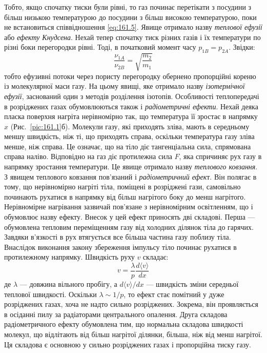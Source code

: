 Тобто, якщо спочатку тиски були рівні, то газ починає перетікати з посудини з більш низькою температурою до посудини з більш високою температурою, поки не встановиться співвідношення \eqref{eq:161.5}.
Явище отримало назву \emph{теплової ефузії} або \emph{ефекту Кнудсена}.
Нехай тепер спочатку тиск різних газів і їх температури по різні боки перегородки рівні.
Тоді, в початковий момент часу $p_{1B} = p_{2A}$.
Звідки:
\begin{equation}
	\frac{\nu_{1A}}{\nu_{2B}} = \sqrt{\frac{m_2}{m_1}}
	\label{eq:161.6}
\end{equation}
%
тобто ефузивні потоки через пористу перегородку обернено пропорційні кореню із молекулярної маси газу.
На цьому явищі, яке отримало назву \emph{ізотермічної ефузії}, заснований один з методів розділення ізотопів.
Особливості теплопередачі в розріджених газах обумовлюються також і \emph{радіометричні ефекти}.
Нехай деяка пласка поверхня нагріта нерівномірно так, що температура її зростає в напрямку $x$ (Рис.~\ref{pic:161.1}б).
Молекули газу, які приходять зліва, мають в середньому меншу швидкість, ніж ті, що приходять справа, оскільки температура газу зліва менше, ніж справа.
Це означає, що на тіло діє тангенціальна сила, спрямована справа наліво.
Відповідно на газ діє протилежна сила $F$, яка спричиняє рух газу в напрямку зростання температури.
Це явище отримало назву \emph{теплового ковзання}.
З явищем теплового ковзання пов'язаний і \emph{радіометричний ефек}т.
Він полягає в тому, що нерівномірно нагріті тіла, поміщені в розріджені гази, самовільно починають рухатися в напрямку від більш нагрітого боку до менш нагрітого.
Нерівномірне нагрівання зазвичай пов'язане з нерівномірним освітленням, що і обумовлює назву ефекту.
Внесок у цей ефект приносять дві складові.
Перша --- обумовлена тепловим переміщенням газу від холодних ділянок тіла до гарячих.
Завдяки в’язкості в рух втягується все більша частина газу поблизу тіла.
Внаслідок виконання закону збереження імпульсу тіло починає рухатися в протилежному напрямку.
Швидкість руху $v$ складає:
\begin{equation}
	v = \frac{\lambda}{p} \frac{d\langle v\rangle}{dx}
	\label{eq:161.7}
\end{equation}
%
де $\lambda$ --- довжина вільного пробігу, а $d\langle v\rangle/dx$ --- швидкість зміни середньої теплової швидкості.
Оскільки $\lambda \sim 1/p$, то ефект стає помітний у дуже розріджених газах, хоча не надто сильно розріджених.
Зокрема, він проявляється в осіданні пилу за радіаторами центрального опалення.
Друга складова радіометричного ефекту обумовлена тим, що нормальна складова швидкості молекул, що відлітають від більш нагрітої ділянки, більша, ніж від менш нагрітої.
Ця складова є основною у сильно розріджених газах і пропорційна тиску газу.


